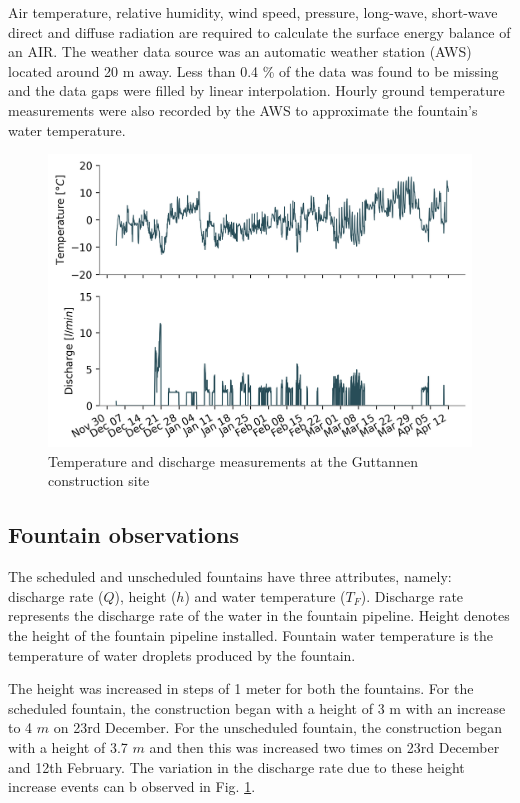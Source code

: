 \documentclass[tc, manuscript]{copernicus}
\begin{document}
Air temperature, relative humidity, wind speed, pressure, long-wave, short-wave direct and diffuse radiation are
required to calculate the surface energy balance of an AIR.  The weather data source was an automatic weather
station (AWS) located around 20 m away. Less than 0.4 \% of the data was found to be missing and the data gaps
were filled by linear interpolation. Hourly ground temperature measurements were also recorded by the AWS to
approximate the fountain's water temperature. 

\begin{figure}[t]
\includegraphics[width=12cm]{Figures/disvstemp.png}
\caption{Temperature and discharge measurements at the Guttannen construction site}
\label{fig:aws} 
\end{figure}

\subsection{Fountain observations}

The scheduled and unscheduled fountains have three attributes, namely: discharge rate ($Q$), height ($h$) and
water temperature ($T_F$). Discharge rate represents the discharge rate of the water in the fountain pipeline.
Height denotes the height of the fountain pipeline installed. Fountain water temperature is the temperature of
water droplets produced by the fountain.

The height was increased in steps of 1 meter for both the fountains. For the scheduled fountain, the
construction began with a height of 3 m with an increase to 4 $m$ on 23rd December. For the unscheduled
fountain, the construction began with a height of 3.7 $m$ and then this was increased two times on 23rd December
and 12th February. The variation in the discharge rate due to these height increase events can b observed in
Fig. \ref{fig:aws}. 
\end{document}
